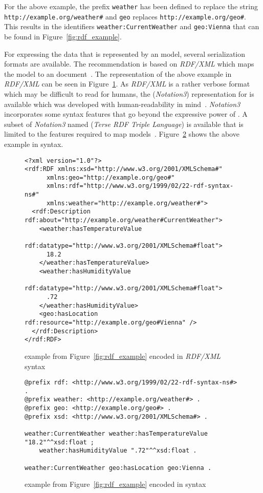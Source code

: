 For the above example, the prefix \texttt{weather} has been defined to replace the string \texttt{http://\hspace{0pt}example.org/weather\#} and \texttt{geo} replaces \texttt{http://example.org/geo\#}. This results in the identifiers \texttt{weather:CurrentWeather} and \texttt{geo:Vienna} that can be found in Figure~\ref{fig:rdf_example}.

For expressing the data that is represented by an  model, several serialization formats are available. The  recommendation is based on \emph{RDF/XML} which maps the  model to an  document~\cite{RDF_XML}. The representation of the above example in \emph{RDF/XML} can be seen in Figure~\ref{fig:rdfxml_example}. As \emph{RDF/XML} is a rather verbose format which may be difficult to read for humans, the  (\emph{Notation3}) representation for  is available which was developed with human-readability in mind~\cite{Notation3}. \emph{Notation3} incorporates some syntax features that go beyond the expressive power of . A subset of \emph{Notation3} named  (\emph{Terse RDF Triple Language}) is available that is limited to the features required to map  models~\cite{Turtle}. Figure~\ref{fig:turtle_example} shows the above example in  syntax.

\begin{figure} %
\begin{lstlisting}
<?xml version="1.0"?>
<rdf:RDF xmlns:xsd="http://www.w3.org/2001/XMLSchema#"
      xmlns:geo="http://example.org/geo#"
      xmlns:rdf="http://www.w3.org/1999/02/22-rdf-syntax-ns#"
      xmlns:weather="http://example.org/weather#">
  <rdf:Description rdf:about="http://example.org/weather#CurrentWeather">
    <weather:hasTemperatureValue
	  rdf:datatype="http://www.w3.org/2001/XMLSchema#float">
      18.2
    </weather:hasTemperatureValue>
    <weather:hasHumidityValue
	  rdf:datatype="http://www.w3.org/2001/XMLSchema#float">
      .72
    </weather:hasHumidityValue>
    <geo:hasLocation rdf:resource="http://example.org/geo#Vienna" />
  </rdf:Description>
</rdf:RDF>
\end{lstlisting}
\caption{ example from Figure~\ref{fig:rdf_example} encoded in \emph{RDF/XML} syntax}
\label{fig:rdfxml_example}
\end{figure}

\begin{figure}
\begin{lstlisting}
@prefix rdf: <http://www.w3.org/1999/02/22-rdf-syntax-ns#> .
@prefix weather: <http://example.org/weather#> .
@prefix geo: <http://example.org/geo#> .
@prefix xsd: <http://www.w3.org/2001/XMLSchema#> .

weather:CurrentWeather weather:hasTemperatureValue "18.2"^^xsd:float ;
    weather:hasHumidityValue ".72"^^xsd:float .

weather:CurrentWeather geo:hasLocation geo:Vienna .
\end{lstlisting}
\caption{ example from Figure~\ref{fig:rdf_example} encoded in  syntax}
\label{fig:turtle_example}
\end{figure}

